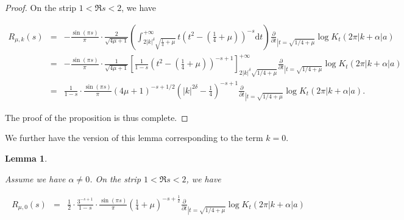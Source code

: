 \documentclass{jams-l}
\newtheorem{lemma}[theorem]{Lemma}
\theoremstyle{definition}
\theoremstyle{remark}
\numberwithin{equation}{section}
\begin{document}
            \begin{proof}
            
                On the strip $1 < \Re s < 2$, we have
                
                \[ \begin{array}{lll}
                        \scriptstyle R_{\mu,k} \left( s \right) & \scriptstyle = & \scriptstyle - \frac{\sin \left( \pi s \right)}{\pi} \cdot \frac{2}{\sqrt{4 \mu + 1}} \left( \int_{2 \left \vert k \right \vert^{\delta} \sqrt{\frac{1}{4} + \mu}}^{+ \infty} t \left( t^2 - \left( \frac{1}{4} + \mu \right) \right)^{-s} \mathrm{d}t \right) \frac{\partial}{\partial t}_{\left \vert t = \sqrt{1/4 + \mu} \right.} \log K_t \left( 2 \pi \left \vert k + \alpha \right \vert a \right) \\[1em]
                        
                        & \scriptstyle = & \scriptstyle - \frac{\sin \left( \pi s \right)}{\pi} \cdot \frac{1}{\sqrt{4 \mu + 1}} \left[ \frac{1}{1 - s} \left( t^2 - \left( \frac{1}{4} + \mu \right) \right)^{-s+1} \right]_{2 \left \vert k \right \vert^{\delta} \sqrt{1/4 + \mu}}^{+ \infty} \frac{\partial}{\partial t}_{\left \vert t = \sqrt{1/4 + \mu} \right.} \log K_t \left( 2 \pi \left \vert k + \alpha \right \vert a \right) \\[1em]
                        
                        & \scriptstyle = & \scriptstyle \frac{1}{1-s} \cdot \frac{\sin \left( \pi s \right)}{\pi} \left( 4 \mu + 1 \right)^{-s+ 1/2} \left( \left \vert k \right \vert^{2 \delta} - \frac{1}{4} \right)^{-s+1} \frac{\partial}{\partial t}_{\left \vert t = \sqrt{1/4 + \mu} \right.} \log K_t \left( 2 \pi \left \vert k + \alpha \right \vert a \right).
                    \end{array} \]
                
                \noindent The proof of the proposition is thus complete.
            
            \end{proof}
            
            We further have the version of this lemma corresponding to the term $k = 0$.
            
            \begin{lemma}
            \label{LemRmuk-0}
            
                Assume we have $\alpha \neq 0$. On the strip $1 < \Re s < 2$, we have
                
                \[ \begin{array}{lll}
                        R_{\mu, 0} \left( s \right) & = & \frac{1}{2} \cdot \frac{3^{-s + 1}}{1 - s} \cdot \frac{\sin \left( \pi s \right)}{\pi} \left( \frac{1}{4} + \mu \right)^{-s+\frac{1}{2}} \frac{\partial}{\partial t}_{\left \vert t = \sqrt{1/4 + \mu} \right.} \log K_t \left( 2 \pi \left \vert k + \alpha \right \vert a \right)
                    \end{array} \]
            
            \end{lemma}
            
\end{document}
